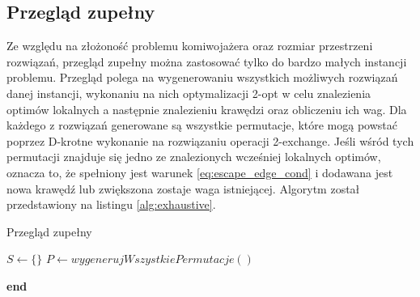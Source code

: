 \newpage

\subsection{Przegląd zupełny}
Ze względu na złożoność problemu komiwojażera oraz rozmiar przestrzeni rozwiązań, przegląd zupełny można zastosować tylko do bardzo małych instancji problemu.
Przegląd polega na wygenerowaniu wszystkich możliwych rozwiązań danej instancji, wykonaniu na nich optymalizacji 2-opt w celu znalezienia
optimów lokalnych a następnie znalezieniu krawędzi oraz obliczeniu ich wag. Dla każdego z rozwiązań generowane są wszystkie
permutacje, które mogą powstać poprzez D-krotne wykonanie na rozwiązaniu operacji 2-exchange. Jeśli wśród tych permutacji znajduje się jedno ze znalezionych wcześniej
lokalnych optimów, oznacza to, że spełniony jest warunek \ref{eq:escape_edge_cond} i dodawana jest nowa krawędź lub zwiększona zostaje waga istniejącej.
Algorytm został przedstawiony na listingu \ref{alg:exhaustive}.

\begin{algorithm}[]
    \caption{Przegląd zupełny}\label{alg:exhaustive}
    $S \gets \{\}$\;
    $P \gets wygenerujWszystkiePermutacje()$\;




    \vspace{1em}

    \textbf{end}

\end{algorithm}

